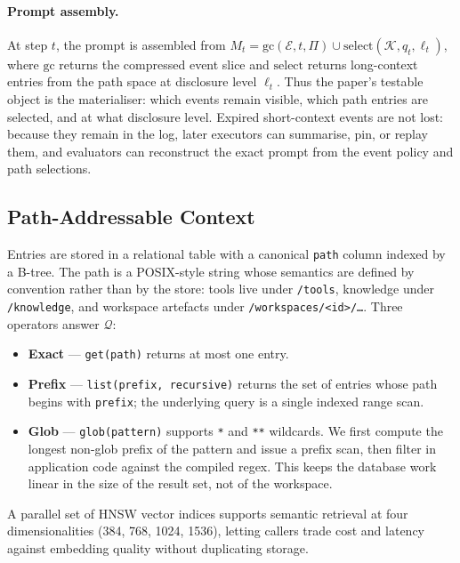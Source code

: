 \paragraph{Prompt assembly.}
At step $t$, the prompt is assembled from
$M_t = \mathrm{gc}(\mathcal{E}, t, \Pi) \cup
\mathrm{select}(\mathcal{K}, q_t, \ell_t)$, where
$\mathrm{gc}$ returns the compressed event slice and
$\mathrm{select}$ returns long-context entries from the path space at
disclosure level $\ell_t$. Thus the paper's testable object is the
materialiser: which events remain visible, which path entries are
selected, and at what disclosure level.
Expired short-context events are not lost: because they remain in the
log, later executors can summarise, pin, or replay them, and
evaluators can reconstruct the exact prompt from the event policy and
path selections.

\subsection{Path-Addressable Context}
\label{sec:component_a}

Entries are stored in a relational table with a canonical \texttt{path}
column indexed by a B-tree. The path is a POSIX-style string whose
semantics are defined by convention rather than by the store: tools
live under \texttt{/tools}, knowledge under \texttt{/knowledge}, and
workspace artefacts under \texttt{/workspaces/<id>/\dots}. Three
operators answer $\mathcal{Q}$:
\begin{itemize}
    \item \textbf{Exact} --- \texttt{get(path)} returns at most one
    entry.
    \item \textbf{Prefix} --- \texttt{list(prefix, recursive)} returns
    the set of entries whose path begins with \texttt{prefix}; the
    underlying query is a single indexed range scan.
    \item \textbf{Glob} --- \texttt{glob(pattern)} supports \texttt{*}
    and \texttt{**} wildcards. We first compute the longest non-glob
    prefix of the pattern and issue a prefix scan, then filter in
    application code against the compiled regex. This keeps the
    database work linear in the size of the result set, not of the
    workspace.
\end{itemize}
A parallel set of HNSW vector indices supports semantic retrieval at
four dimensionalities (384, 768, 1024, 1536), letting callers trade
cost and latency against embedding quality without duplicating
storage.

